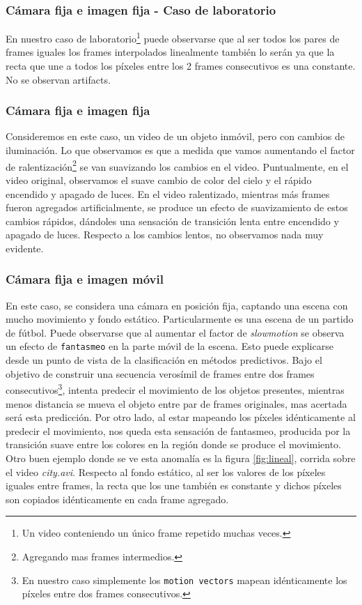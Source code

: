 \subsubsection*{Cámara fija e imagen fija - Caso de laboratorio}
En nuestro caso de laboratorio\footnote{Un video conteniendo un único frame repetido muchas veces.} puede observarse que al ser todos los pares de frames iguales los frames interpolados linealmente también lo serán ya que la recta que une a todos los píxeles entre los 2 frames consecutivos es una constante. No se observan artifacts.

\subsubsection*{Cámara fija e imagen fija}
Consideremos en este caso, un video de un objeto inmóvil, pero con cambios de iluminación. Lo que observamos es que a medida que vamos aumentando el factor de ralentización\footnote{Agregando mas frames intermedios.} se van suavizando los cambios en el video. Puntualmente, en el video original, observamos el suave cambio de color del cielo y el rápido encendido y apagado de luces. En el video ralentizado, mientras más frames fueron agregados artificialmente, se produce un efecto de suavizamiento de estos cambios rápidos, dándoles una sensación de transición lenta entre encendido y apagado de luces. Respecto a los cambios lentos, no observamos nada muy evidente.

\subsubsection*{Cámara fija e imagen móvil}
En este caso, se considera una cámara en posición fija, captando una escena con mucho movimiento y fondo estático. Particularmente es una escena de un partido de fútbol. Puede observarse que al aumentar el factor de \emph{slowmotion} se observa un efecto de \texttt{fantasmeo} en la parte móvil de la escena. Esto puede explicarse desde un punto de vista de la clasificación en métodos predictivos. Bajo el objetivo de construir una secuencia verosímil de frames entre dos frames consecutivos\footnote{En nuestro caso simplemente los \texttt{motion vectors} mapean idénticamente los píxeles entre dos frames consecutivos\cite{motion}.}, intenta predecir el movimiento de los objetos presentes, mientras menos distancia se mueva el objeto entre par de frames originales, mas acertada será esta predicción. Por otro lado, al estar mapeando los píxeles idénticamente al predecir el movimiento, nos queda esta sensación de fantasmeo, producida por la transición suave entre los colores en la región donde se produce el movimiento. Otro buen ejemplo donde se ve esta anomalía es la figura \ref{fig:lineal}, corrida sobre el video \emph{city.avi}. Respecto al fondo estático, al ser los valores de los píxeles iguales entre frames, la recta que los une también es constante y dichos píxeles son copiados idénticamente en cada frame agregado.


